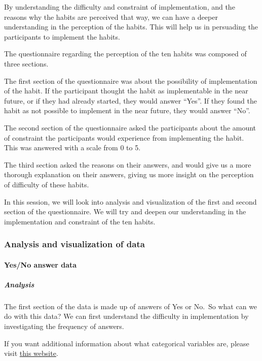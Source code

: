 \documentclass[
]{article}
\begin{document}
By understanding the difficulty and constraint of implementation, and
the reasons why the habits are perceived that way, we can have a deeper
understanding in the perception of the habits. This will help us in
persuading the participants to implement the habits.

The questionnaire regarding the perception of the ten habits was
composed of three sections.

The first section of the questionnaire was about the possibility of
implementation of the habit. If the participant thought the habit as
implementable in the near future, or if they had already started, they
would answer ``Yes''. If they found the habit as not possible to
implement in the near future, they would answer ``No''.

The second section of the questionnaire asked the participants about the
amount of constraint the participants would experience from implementing
the habit. This was answered with a scale from 0 to 5.

The third section asked the reasons on their answers, and would give us
a more thorough explanation on their answers, giving us more insight on
the perception of difficulty of these habits.

In this session, we will look into analysis and visualization of the
first and second section of the questionnaire. We will try and deepen
our understanding in the implementation and constraint of the ten
habits.

\hypertarget{analysis-and-visualization-of-data}{%
\subsubsection{Analysis and visualization of
data}\label{analysis-and-visualization-of-data}}

\hypertarget{yesno-answer-data}{%
\paragraph{Yes/No answer data}\label{yesno-answer-data}}

\hypertarget{analysis}{%
\subparagraph{Analysis}\label{analysis}}

The first section of the data is made up of answers of Yes or No.~So
what can we do with this data? We can first understand the difficulty in
implementation by investigating the frequency of answers.

If you want additional information about what categorical variables are,
please visit
\href{https://www150.statcan.gc.ca/n1/edu/power-pouvoir/ch8/5214817-eng.htm}{this
website}.
\end{document}
